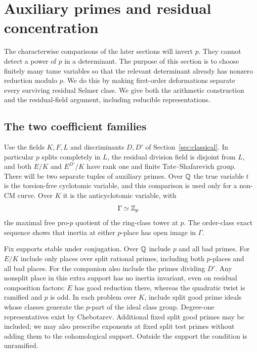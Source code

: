 \section{Auxiliary primes and residual concentration}\label{sec:vertical}

The characterwise comparisons of the later sections will invert $p$.
They cannot detect a power of $p$ in a determinant.  The purpose of
this section is to choose finitely many tame variables so that the
relevant determinant already has nonzero reduction modulo $p$.
We do this by making first-order deformations separate every
surviving residual Selmer class.  We give both the arithmetic construction
and the residual-field argument, including reducible representations.

\subsection{The two coefficient families}

Use the fields $K,F,L$ and discriminants $D,D'$ of
Section~\ref{sec:classical}.  In particular $p$ splits completely in
$L$, the residual division field is disjoint from $L$, and both
$E/K$ and $E^{D'}/K$ have rank one and finite Tate--Shafarevich group.
There will be two separate tuples of auxiliary primes.  Over $\mathbb Q$
the true variable $t$ is the torsion-free cyclotomic variable, and
this comparison is used only for a non-CM curve.  Over $K$ it is the
anticyclotomic variable, with
\[
 \Gamma\simeq\mathbb Z_p
\]
the maximal free pro-$p$ quotient of the ring-class tower at $p$.
The order-class exact sequence shows that inertia at either
$p$-place has open image in $\Gamma$.

Fix supports stable under conjugation.  Over $\mathbb Q$ include $p$ and
all bad primes.  For $E/K$ include only places over split rational
primes, including both $p$-places and all bad places.  For the
companion also include the primes dividing $D'$.  Any nonsplit place
in this extra support has no inertia invariant, even on residual
composition factors: $E$ has good reduction there, whereas the
quadratic twist is ramified and $p$ is odd.  In each problem over
$K$, include split good prime ideals whose classes generate the
$p$-part of the ideal class group.  Degree-one representatives exist
by Chebotarev.  Additional fixed split good primes may be included;
we may also prescribe exponents at fixed split test primes without
adding them to the cohomological support.  Outside the support the
condition is unramified.

